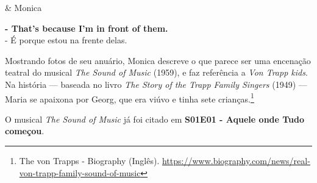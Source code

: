 \begin{tcolorbox}[enhanced,center upper,
    drop fuzzy shadow southeast, boxrule=0.3pt,
    lower separated=false, breakable,
    colframe=black!30!dialogoBorder,colback=white]
\medskip
\begin{minipage}[c]{0.16\linewidth}
   & \centering \scriptsize{Monica}
\end{minipage}
\hfill
\begin{minipage}[c]{0.8\linewidth}
  \textbf{- That's because I'm in front of them.}\\
  - É porque estou na frente delas.
\end{minipage}
\end{tcolorbox}

Mostrando fotos de seu anuário, Monica descreve o que parece ser uma
encenação teatral do musical \emph{The Sound of Music} (1959), e faz
referência a \emph{Von Trapp kids}. Na história --- baseada no livro
\emph{The Story of the Trapp Family Singers} (1949) --- Maria se
apaixona por Georg, que era viúvo e tinha sete crianças.\footnote{\sloppy The von Trapps - Biography (Inglês). \url{https://www.biography.com/news/real-von-trapp-family-sound-of-music}}

O musical \emph{The Sound of Music} já foi citado em
\textbf{\textcolor{primarycolor}{S01E01 - Aquele onde Tudo começou}}.
